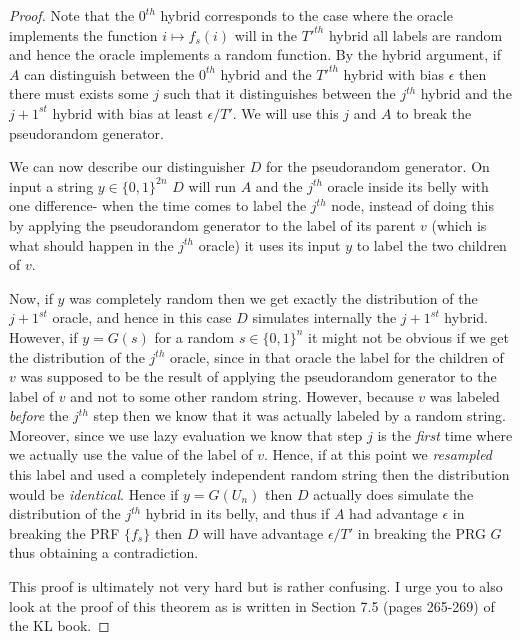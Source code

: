 \begin{proof}
Note that the \(0^{th}\) hybrid corresponds to the case where the oracle
implements the function \(i\mapsto f_s(i)\) will in the \(T'^{th}\)
hybrid all labels are random and hence the oracle implements a random
function. By the hybrid argument, if \(A\) can distinguish between the
\(0^{th}\) hybrid and the \(T'^{th}\) hybrid with bias \(\epsilon\) then
there must exists some \(j\) such that it distinguishes between the
\(j^{th}\) hybrid and the \(j+1^{st}\) hybrid with bias at least
\(\epsilon/T'\). We will use this \(j\) and \(A\) to break the
pseudorandom generator.

We can now describe our distinguisher \(D\) for the pseudorandom
generator. On input a string \(y\in\{0,1\}^{2n}\) \(D\) will run \(A\)
and the \(j^{th}\) oracle inside its belly with one difference- when the
time comes to label the \(j^{th}\) node, instead of doing this by
applying the pseudorandom generator to the label of its parent \(v\)
(which is what should happen in the \(j^{th}\) oracle) it uses its input
\(y\) to label the two children of \(v\).

Now, if \(y\) was completely random then we get exactly the distribution
of the \(j+1^{st}\) oracle, and hence in this case \(D\) simulates
internally the \(j+1^{st}\) hybrid. However, if \(y=G(s)\) for a random
\(s\in\{0,1\}^n\) it might not be obvious if we get the distribution of
the \(j^{th}\) oracle, since in that oracle the label for the children
of \(v\) was supposed to be the result of applying the pseudorandom
generator to the label of \(v\) and not to some other random string.
However, because \(v\) was labeled \emph{before} the \(j^{th}\) step
then we know that it was actually labeled by a random string. Moreover,
since we use lazy evaluation we know that step \(j\) is the \emph{first}
time where we actually use the value of the label of \(v\). Hence, if at
this point we \emph{resampled} this label and used a completely
independent random string then the distribution would be
\emph{identical}. Hence if \(y=G(U_n)\) then \(D\) actually does
simulate the distribution of the \(j^{th}\) hybrid in its belly, and
thus if \(A\) had advantage \(\epsilon\) in breaking the PRF
\(\{ f_s \}\) then \(D\) will have advantage \(\epsilon/T'\) in breaking
the PRG \(G\) thus obtaining a contradiction.

This proof is ultimately not very hard but is rather confusing. I urge
you to also look at the proof of this theorem as is written in Section
7.5 (pages 265-269) of the KL book.

\end{proof}

